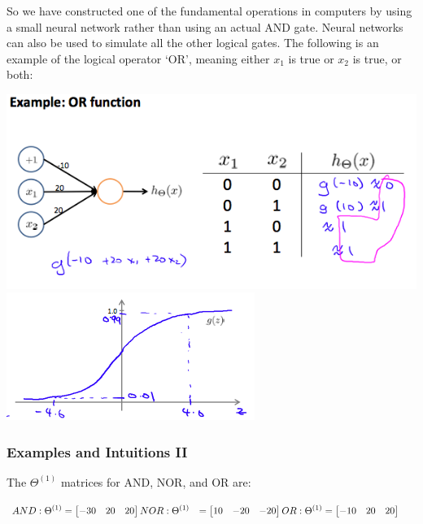 \documentclass[
]{article}
\begin{document}
So we have constructed one of the fundamental operations in computers by
using a small neural network rather than using an actual AND gate.
Neural networks can also be used to simulate all the other logical
gates. The following is an example of the logical operator `OR', meaning
either \(x_1\) is true or \(x_2\) is true, or both:

\includegraphics{NN_example_OR.png} \includegraphics{NN_example_2.png}

\hypertarget{examples-and-intuitions-ii}{%
\subsubsection{Examples and Intuitions
II}\label{examples-and-intuitions-ii}}

The \(Θ^{(1)}\) matrices for AND, NOR, and OR are:

\(\begin{align*}AND:\newline\Theta^{(1)} &=\begin{bmatrix}-30 & 20 & 20\end{bmatrix} \newline NOR:\newline\Theta^{(1)} &= \begin{bmatrix}10 & -20 & -20\end{bmatrix} \newline OR:\newline\Theta^{(1)} &= \begin{bmatrix}-10 & 20 & 20\end{bmatrix} \newline\end{align*}\)
\end{document}
